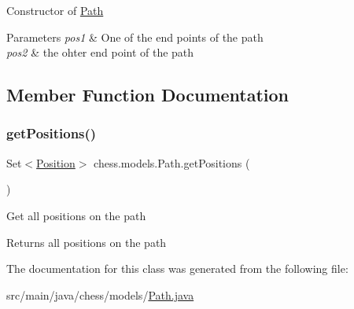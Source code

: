 Constructor of \mbox{\hyperlink{classchess_1_1models_1_1_path}{Path}}


\begin{DoxyParams}{Parameters}
{\em pos1} & One of the end points of the path \\
\hline
{\em pos2} & the ohter end point of the path \\
\hline
\end{DoxyParams}


\subsection{Member Function Documentation}
\mbox{\label{classchess_1_1models_1_1_path_adce43d0b62fd3ba9d7ac261fcf4cf7b1}} 
\subsubsection{\texorpdfstring{get\+Positions()}{getPositions()}}
{\footnotesize\ttfamily Set$<$\mbox{\hyperlink{classchess_1_1models_1_1_position}{Position}}$>$ chess.\+models.\+Path.\+get\+Positions (\begin{DoxyParamCaption}{ }\end{DoxyParamCaption})}

Get all positions on the path

\begin{DoxyReturn}{Returns}
all positions on the path 
\end{DoxyReturn}


The documentation for this class was generated from the following file\+:\begin{DoxyCompactItemize}
\item 
src/main/java/chess/models/\mbox{\hyperlink{_path_8java}{Path.\+java}}\end{DoxyCompactItemize}
